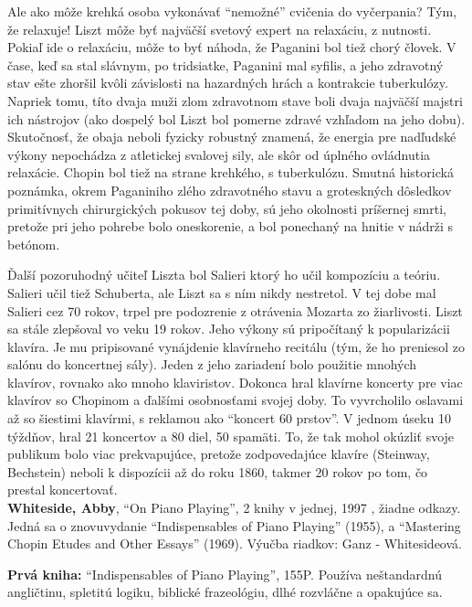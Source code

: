 \documentclass[11pt,a4paper]{book}
\begin{document}
Ale ako môže krehká osoba vykonávať “nemožné” cvičenia do vyčerpania? Tým, že relaxuje! Liszt môže byť najväčší svetový expert na relaxáciu, z nutnosti. Pokiaľ ide o relaxáciu, môže to byť náhoda, že Paganini bol tiež chorý človek. V čase, keď sa stal slávnym, po tridsiatke, Paganini mal syfilis, a jeho zdravotný stav ešte zhoršil kvôli závislosti na hazardných hrách a kontrakcie tuberkulózy. Napriek tomu, títo dvaja muži zlom zdravotnom stave boli dvaja najväčší majstri ich nástrojov (ako dospelý bol Liszt bol pomerne zdravé vzhľadom na jeho dobu). Skutočnosť, že obaja neboli fyzicky robustný znamená, že energia pre nadľudské výkony nepochádza z atletickej svalovej sily, ale skôr od úplného ovládnutia relaxácie. Chopin bol tiež na strane krehkého, s tuberkulózu. Smutná historická poznámka, okrem Paganiniho zlého zdravotného stavu a groteskných dôsledkov primitívnych chirurgických pokusov tej doby, sú jeho okolnosti príšernej smrti, pretože pri jeho pohrebe bolo oneskorenie, a bol ponechaný na hnitie v nádrži s betónom. 

Ďalší pozoruhodný učiteľ Liszta bol Salieri ktorý ho učil kompozíciu a teóriu. Salieri učil tiež Schuberta, ale Liszt sa s ním nikdy nestretol. V tej dobe mal Salieri cez 70 rokov, trpel pre podozrenie z otrávenia Mozarta zo žiarlivosti. Liszt sa stále zlepšoval vo veku 19 rokov. Jeho výkony sú pripočítaný k popularizácii klavíra. Je mu pripisované vynájdenie klavírneho recitálu (tým, že ho preniesol zo salónu do koncertnej sály). Jeden z jeho zariadení bolo použitie mnohých klavírov, rovnako ako mnoho klaviristov. Dokonca hral klavírne koncerty pre viac klavírov so Chopinom a ďalšími osobnosťami svojej doby. To vyvrcholilo oslavami až so šiestimi klavírmi, s reklamou ako “koncert 60 prstov”. V jednom úseku 10 týždňov, hral 21 koncertov a 80 diel, 50 spamäti. To, že tak mohol okúzliť svoje publikum bolo viac prekvapujúce, pretože zodpovedajúce klavíre (Steinway, Bechstein) neboli k dispozícii až do roku 1860, takmer 20 rokov po tom, čo prestal koncertovať.
\medskip\\
\textbf{\hypertarget{r:whiteside}{Whiteside, Abby}}\label{ref:whiteside}, “On Piano Playing”, 2 knihy v jednej, 1997 , žiadne odkazy. Jedná sa o znovuvydanie “Indispensables of Piano Playing” (1955), a “Mastering Chopin Etudes and Other Essays” (1969). Výučba riadkov: Ganz - Whitesideová. 

\textbf{Prvá kniha:} “Indispensables of Piano Playing”, 155P. Používa neštandardnú angličtinu, spletitú logiku, biblické frazeológiu, dlhé rozvláčne a opakujúce sa. 
\end{document}
